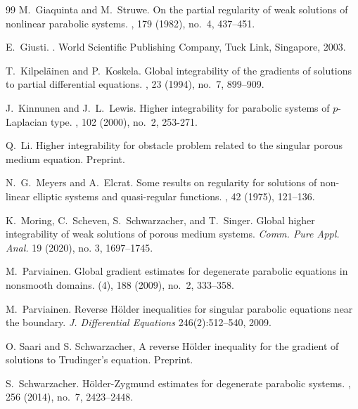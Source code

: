 \documentclass[a4paper, 10pt, american]{amsart}
\numberwithin{theorem}{section}
\numberwithin{equation}{section}
\begin{document}
\begin{thebibliography}{99}
\newblock M.~Giaquinta and M.~Struwe.
\newblock On the partial regularity of weak solutions of nonlinear parabolic systems.
, 179 (1982), no.~4, 437--451.

\newblock E.~Giusti.
.
\newblock World Scientific Publishing Company, Tuck Link, Singapore, 2003.

T.~Kilpel{\"a}inen and P.~Koskela.
\newblock Global integrability of the gradients of solutions to partial
  differential equations.
, 23 (1994), no.~7, 899--909.

\newblock J.~Kinnunen and J.~L.~Lewis.
\newblock Higher integrability for parabolic systems of $p$-Laplacian type.
, 102 (2000), no.~2, 253-271.

  \newblock Q.~Li.
  \newblock Higher integrability for obstacle problem related to the
  singular porous medium equation.
  \newblock Preprint.

\newblock N.~G.~Meyers and A.~Elcrat.
\newblock Some results on regularity for solutions of non-linear elliptic
systems and quasi-regular functions.
, 42 (1975), 121--136.

  K.~Moring, C.~Scheven, S.~Schwarzacher, and T.~Singer.
  \newblock Global higher integrability of weak solutions
  of porous medium systems.
  \newblock \emph{Comm. Pure Appl. Anal. }19 (2020), no. 3, 1697--1745.
  
\newblock M.~Parviainen.
\newblock Global gradient estimates for degenerate parabolic equations in nonsmooth domains. 
 (4), 188 (2009), no.~2, 333--358.

  M.~Parviainen.
  \newblock Reverse H\"older inequalities for singular parabolic
  equations near the boundary.
  \newblock \emph{J. Differential Equations} 246(2):512--540, 2009.

  O. Saari and S. Schwarzacher,
  \newblock A reverse H\"older inequality for the gradient of solutions to
  Trudinger's equation.
  \newblock Preprint.


\newblock S.~Schwarzacher.
\newblock H\"older-Zygmund estimates for degenerate parabolic systems.
, 256 (2014), no.~7, 2423--2448.


\end{thebibliography}
\end{document}
